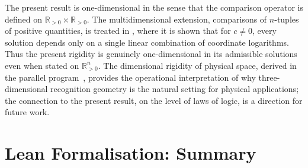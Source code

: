 \documentclass[11pt,a4paper]{article}
\theoremstyle{definition}
\theoremstyle{remark}
\begin{document}
The present result is one-dimensional in the sense that the comparison
operator is defined on $\mathbb{R}_{>0} \times \mathbb{R}_{>0}$. The
multidimensional extension, comparisons of $n$-tuples of positive
quantities, is treated in
\cite[Section~4]{WashburnZlatanovicAllahyarov2026}, where it is shown that
for $c \neq 0$, every solution depends only on a single linear
combination of coordinate logarithms. Thus the present rigidity is
genuinely one-dimensional in its admissible solutions even when stated on
$\mathbb{R}_{>0}^n$. The dimensional rigidity of physical space, derived
in the parallel program~\cite{PardoGuerraThapaWashburnAllahyarov2026},
provides the operational interpretation of why three-dimensional
recognition geometry is the natural setting for physical applications;
the connection to the present result, on the level of laws of logic, is a
direction for future work.

\section{Lean Formalisation: Summary}\label{sec:lean-status}
\end{document}
